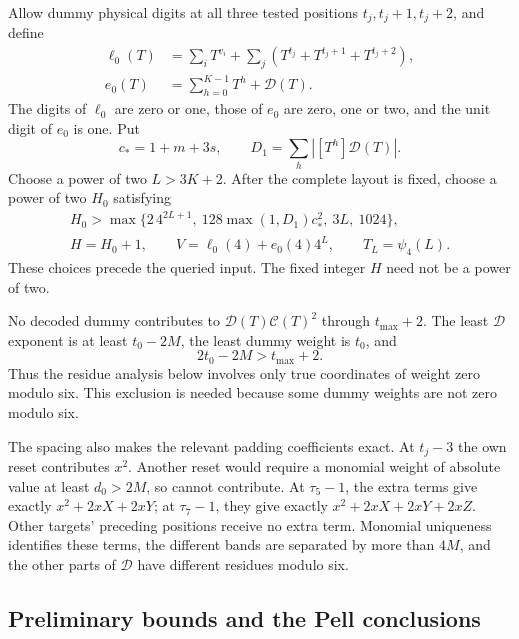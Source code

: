 Allow dummy physical digits at all three tested positions
$t_j,t_j+1,t_j+2$, and define
\begin{equation}\label{eq:affine-radix-codes}
 \begin{aligned}
 \ell_0(T)&=\sum_iT^{v_i}
              +\sum_j(T^{t_j}+T^{t_j+1}+T^{t_j+2}),\\
 e_0(T)&=\sum_{h=0}^{K-1}T^h+\mathcal D(T).
 \end{aligned}
\end{equation}
The digits of $\ell_0$ are zero or one, those of $e_0$ are zero,
one or two, and the unit digit of $e_0$ is one. Put
\[
 c_*=1+m+3s,\qquad D_1=\sum_h|[T^h]\mathcal D(T)|.
\]
Choose a power of two $L>3K+2$. After the complete layout is
fixed, choose a power of two $H_0$ satisfying
\begin{equation}\label{eq:affine-radix-index}
 \begin{gathered}
 H_0>\max\{2\,4^{2L+1},\ 128\max(1,D_1)c_*^2,\ 3L,\ 1024\},\\
 H=H_0+1,\qquad V=\ell_0(4)+e_0(4)4^L,\qquad T_L=\psi_4(L).
 \end{gathered}
\end{equation}
These choices precede the queried input. The fixed integer $H$
need not be a power of two.

No decoded dummy contributes to
$\mathcal D(T)\mathcal C(T)^2$ through $t_{\max}+2$.
The least $\mathcal D$ exponent is at least $t_0-2M$, the
least dummy weight is $t_0$, and
\begin{equation}\label{eq:affine-radix-dummies}
 2t_0-2M>t_{\max}+2.
\end{equation}
Thus the residue analysis below involves only true coordinates
of weight zero modulo six. This exclusion is needed because
some dummy weights are not zero modulo six.

The spacing also makes the relevant padding coefficients exact.
At $t_j-3$ the own reset contributes $x^2$. Another reset would
require a monomial weight of absolute value at least
$d_0>2M$, so cannot contribute. At $\tau_5-1$, the extra terms
give exactly $x^2+2xX+2xY$; at $\tau_7-1$, they give exactly
$x^2+2xX+2xY+2xZ$. Other targets' preceding positions receive
no extra term. Monomial uniqueness identifies these terms, the
different bands are separated by more than $4M$, and the other
parts of $\mathcal D$ have different residues modulo six.

\subsection{Preliminary bounds and the Pell conclusions}

